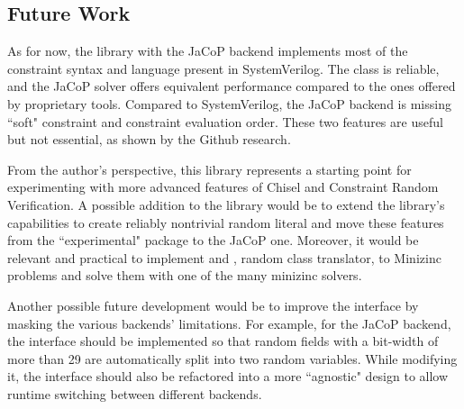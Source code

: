 \subsection{Future Work}
As for now, the library with the JaCoP backend implements most of the constraint
syntax and language present in SystemVerilog. The  class is
reliable, and the JaCoP solver offers equivalent performance compared to the
ones offered by proprietary tools. Compared to SystemVerilog, the JaCoP backend
is missing ``soft" constraint and constraint evaluation order. These two
features are useful but not essential, as shown by the Github research.

From the author's perspective, this library represents a starting point for
experimenting with more advanced features of Chisel and Constraint Random
Verification. A possible addition to the library would be to extend the
library's capabilities to create reliably nontrivial random literal
 and move these features from the ``experimental" package to the
JaCoP one. Moreover, it would be relevant and practical to implement
 and , random class translator, to Minizinc
\cite{nethercote2007minizinc} problems and solve them with one of the many
minizinc solvers.

Another possible future development would be to improve the interface by masking
the various backends' limitations. For example, for the JaCoP backend, the
interface should be implemented so that random fields with a bit-width of more
than 29 are automatically split into two random variables. While modifying it,
the interface should also be refactored into a more ``agnostic" design to allow
runtime switching between different backends.
